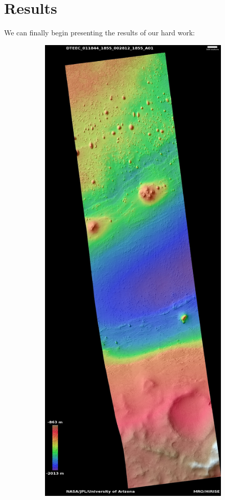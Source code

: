 \documentclass[12pt]{article}
\begin{document}
\section{Results}
\label{sec:results}
\par We can finally begin presenting the results of our hard work:
\begin{figure}[h!]
  \centering
  \begin{subfigure}[t]{0.33\textwidth}
    \centering
    \includegraphics[height=0.5\paperheight]{figures/maps/ESP_011844_1855/DTEEC_011844_1855_002812_1855_A01.jpg}

\end{subfigure}
\end{figure}
\end{document}
